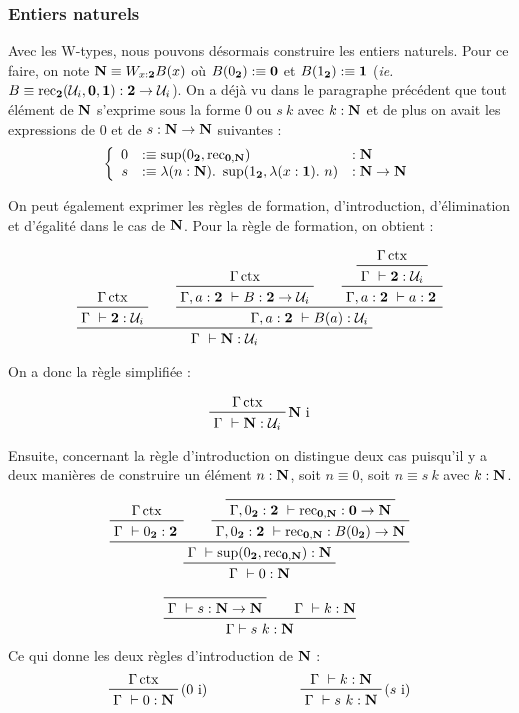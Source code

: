 \documentclass[../../rapport.tex]{subfiles}
\begin{document}
  \subsubsection{Entiers naturels}

  Avec les W-types, nous pouvons désormais construire les entiers naturels.
  Pour ce faire, on note $\mathbf N \equiv W_{x : \operatorname{\textbf{2}}}B(x)$ où $B(0_{\operatorname{\textbf{2}}}) :\equiv \operatorname{\textbf{0}}$ et $B(1_{\operatorname{\textbf{2}}}) :\equiv \operatorname{\textbf{1}}$
  (\textit{ie.} $B \equiv \operatorname{rec}_{\operatorname{\textbf{2}}}(\mathcal U_i, \operatorname{\textbf{0}}, \operatorname{\textbf{1}}) : \operatorname{\textbf{2}} \rightarrow \mathcal U_i$).
  On a déjà vu dans le paragraphe précédent que tout élément de $\mathbf N$ s'exprime sous la forme $0$ ou $s\ k$
  avec $k : \mathbf N$ et de plus on avait les expressions de $0$ et de $s : \mathbf N \rightarrow \mathbf N$ suivantes :
  $$\left\{ \begin{array}{rll}
      0 &:\equiv \sup(0_{\2}, \rec_{\0, \N}) 				&: \N \\
      s &:\equiv \lambda(n : \N).\ \sup(1_{\2}, \lambda(x : \1).\ n)	&: \N \fun \N
  \end{array}\right.$$

  On peut également exprimer les règles de formation, d'introduction, d'élimination et d'égalité dans le cas de $\mathbf N$.
  Pour la règle de formation, on obtient :

  $$
  \prfinterspace=2em
  \prftree
    {\prftree{\Gamma \ctx}{\Gamma\ \vdash \2 : \U_i}}
    {\prftree
      {\prftree{\Gamma \ctx}{\Gamma, a : \2\ \vdash B : \2 \fun \U_i}}
      {\prftree
	{\prftree{\Gamma \ctx}{\Gamma\ \vdash \2 : \U_i}}
      {\Gamma, a : \2\ \vdash a : \2}}
    {\Gamma, a : \2\ \vdash B(a) : \U_i}}
  {\Gamma\ \vdash \N : \U_i}
  $$

  On a donc la règle simplifiée :

  $$
  \prftree[r]{$\N$ i}
    {\Gamma \ctx}
  {\Gamma\ \vdash \N : \U_i}
  $$

  Ensuite, concernant la règle d'introduction on distingue deux cas puisqu'il y a deux manières de construire
  un élément $n : \mathbf N$, soit $n \equiv 0$, soit $n \equiv s\ k$ avec $k : \mathbf N$.

  $$
  \prfinterspace=2em
  \prftree
    {\prftree
      {\prftree{\Gamma \ctx}{\Gamma\ \vdash 0_{\2} : \2}}
      {\prftree
	{\prfaxiom{\Gamma, 0_{\2} : \2\ \vdash \rec_{\0, \N} : \0 \fun \N}}
      {\Gamma, 0_{\2} : \2\ \vdash \rec_{\0, \N} : B(0_{\2}) \fun \N}}
    {\Gamma\ \vdash \sup(0_{\2}, \rec_{\0, \N}) : \N}}
  {\Gamma\ \vdash 0 : \N}
  $$

  $$
  \prfinterspace=2em
  \prftree
    {\prfaxiom{\Gamma\ \vdash s : \N \fun \N}}
    {\Gamma\ \vdash k : \N}
  {\Gamma \vdash s\ k : \N}
  $$
  Ce qui donne les deux règles d'introduction de $\mathbf N$ :
  $$\begin{array}{cc}
    \prftree[r]{($0$ i)}{\Gamma \ctx}{\Gamma\ \vdash 0 : \N}\hspace{2cm} & \prftree[r]{($s$ i)}{\Gamma\ \vdash k : \N}{\Gamma\ \vdash s\ k : \N}
  \end{array}$$
\end{document}
